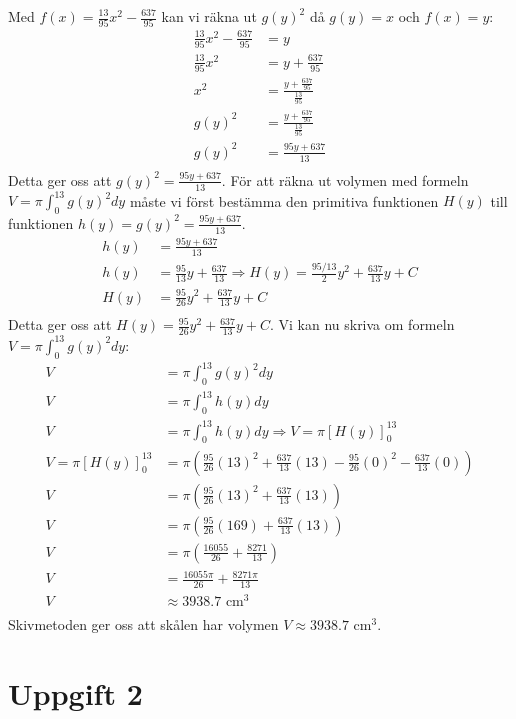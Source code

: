 \documentclass[12pt]{article}
\begin{document}
\newpage
Med $f(x)=\frac{13}{95}x^2-\frac{637}{95}$ kan vi räkna ut $g{(y)}^2$ då $g(y)=x$ och $f(x)=y$:
\begin{align*}
    \frac{13}{95}x^2-\frac{637}{95}&=y\\
    \frac{13}{95}x^2&=y+\frac{637}{95}\\
    x^2&=\frac{y+\frac{637}{95}}{\frac{13}{95}}\\
    g{(y)}^2&=\frac{y+\frac{637}{95}}{\frac{13}{95}}\\
    g{(y)}^2&=\frac{95y+637}{13}\\
\end{align*}
Detta ger oss att $g{(y)}^2=\frac{95y+637}{13}$.
För att räkna ut volymen med formeln $V=\pi\int_{0}^{13}{g(y)}^2dy$ måste vi först bestämma den primitiva funktionen $H(y)$ till funktionen $h(y)=g{(y)}^2=\frac{95y+637}{13}$.
\begin{align*}
    h(y)&=\frac{95y+637}{13}\\
    h(y)&=\frac{95}{13}y+\frac{637}{13} \Rightarrow H(y)=\frac{95/13}{2}y^2+\frac{637}{13}y+C\\
    H(y)&=\frac{95}{26}y^2+\frac{637}{13}y+C\\
\end{align*}
Detta ger oss att $H(y)=\frac{95}{26}y^2+\frac{637}{13}y+C$.
\newpage
Vi kan nu skriva om formeln $V=\pi\int_{0}^{13}{g(y)}^2dy$:
\begin{align*}
    V&=\pi\int_{0}^{13}{g(y)}^2dy\\
    V&=\pi\int_{0}^{13}{h(y)}dy\\
    V&=\pi\int_{0}^{13}{h(y)}dy\Rightarrow V=\pi{\left[{H(y)}\right]}_{0}^{13}\\
    V=\pi{\left[{H(y)}\right]}_{0}^{13}&=\pi\left(\frac{95}{26}{(13)}^2+\frac{637}{13}(13)-\frac{95}{26}{(0)}^2-\frac{637}{13}(0)\right)\\
    V&=\pi\left(\frac{95}{26}{(13)}^2+\frac{637}{13}(13)\right)\\
    V&=\pi\left(\frac{95}{26}{(169)}+\frac{637}{13}(13)\right)\\
    V&=\pi\left(\frac{16055}{26}+\frac{8271}{13}\right)\\
    V&=\frac{16055\pi}{26}+\frac{8271\pi}{13}\\
    V&\approx 3938.7\text{ cm}^3\\
\end{align*}
Skivmetoden ger oss att skålen har volymen $V\approx 3938.7\text{ cm}^3$.
\newpage
\section*{Uppgift 2}
\end{document}
